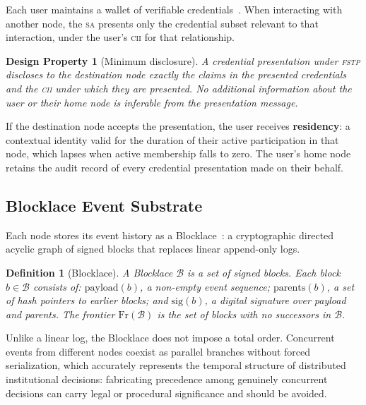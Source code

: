 \documentclass[12pt]{article}
\newtheorem{definition}{Definition}[section]
\newtheorem{property}{Design Property}[section]
\newcommand{\Blocklace}{\mathcal{B}}
\newcommand{\SA}{\textsc{sa}}
\newcommand{\FSTP}{\textsc{fstp}}
\newcommand{\CII}{\textsc{cii}}
\newcommand{\Fr}{\mathrm{Fr}}
\begin{document}
	Each user maintains a wallet of verifiable
	credentials~\cite{w3c2022vc}. When interacting with another node, the
	\SA{} presents only the credential subset relevant to that
	interaction, under the user's \CII{} for that relationship.
	
	\begin{property}[Minimum disclosure]
		\label{prop:mindisclosure}
		A credential presentation under \FSTP{} discloses to the destination
		node exactly the claims in the presented credentials and the \CII{}
		under which they are presented. No additional information about the
		user or their home node is inferable from the presentation message.
	\end{property}
	
	If the destination node accepts the presentation, the user receives
	\textbf{residency}: a contextual identity valid for the duration of
	their active participation in that node, which lapses when active
	membership falls to zero. The user's home node retains the audit record
	of every credential presentation made on their behalf.
	
	\subsection{Blocklace Event Substrate}
	\label{sec:blocklace}
	
	Each node stores its event history as a
	Blocklace~\cite{shapiro2023grassroots,keidar2023cordial}: a
	cryptographic directed acyclic graph of signed blocks that replaces
	linear append-only logs.
	
	\begin{definition}[Blocklace]
		A Blocklace $\Blocklace$ is a set of signed blocks. Each block
		$b \in \Blocklace$ consists of: $\mathrm{payload}(b)$, a non-empty
		event sequence; $\mathrm{parents}(b)$, a set of hash pointers to
		earlier blocks; and $\mathrm{sig}(b)$, a digital signature over
		payload and parents. The frontier $\Fr(\Blocklace)$ is the set of
		blocks with no successors in $\Blocklace$.
	\end{definition}
	
	Unlike a linear log, the Blocklace does not impose a total order.
	Concurrent events from different nodes coexist as parallel branches
	without forced serialization, which accurately represents the temporal
	structure of distributed institutional decisions: fabricating
	precedence among genuinely concurrent decisions can carry legal or
	procedural significance and should be avoided.
	
\end{document}
